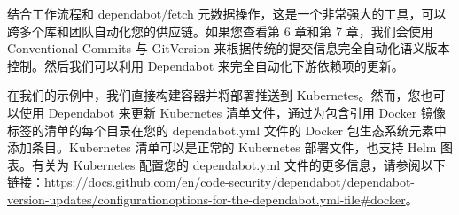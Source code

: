 结合工作流程和 dependabot/fetch 元数据操作，这是一个非常强大的工具，可以跨多个库和团队自动化您的供应链。如果您查看第 6 章和第 7 章，我们会使用 Conventional Commits 与 GitVersion 来根据传统的提交信息完全自动化语义版本控制。然后我们可以利用 Dependabot 来完全自动化下游依赖项的更新。


在我们的示例中，我们直接构建容器并将部署推送到 Kubernetes。然而，您也可以使用 Dependabot 来更新 Kubernetes 清单文件，通过为包含引用 Docker 镜像标签的清单的每个目录在您的 dependabot.yml 文件的 Docker 包生态系统元素中添加条目。Kubernetes 清单可以是正常的 Kubernetes 部署文件，也支持 Helm 图表。有关为 Kubernetes 配置您的 dependabot.yml 文件的更多信息，请参阅以下链接：\url{https://docs.github.com/en/code-security/dependabot/dependabot-version-updates/configurationoptions-for-the-dependabot.yml-file#docker}。